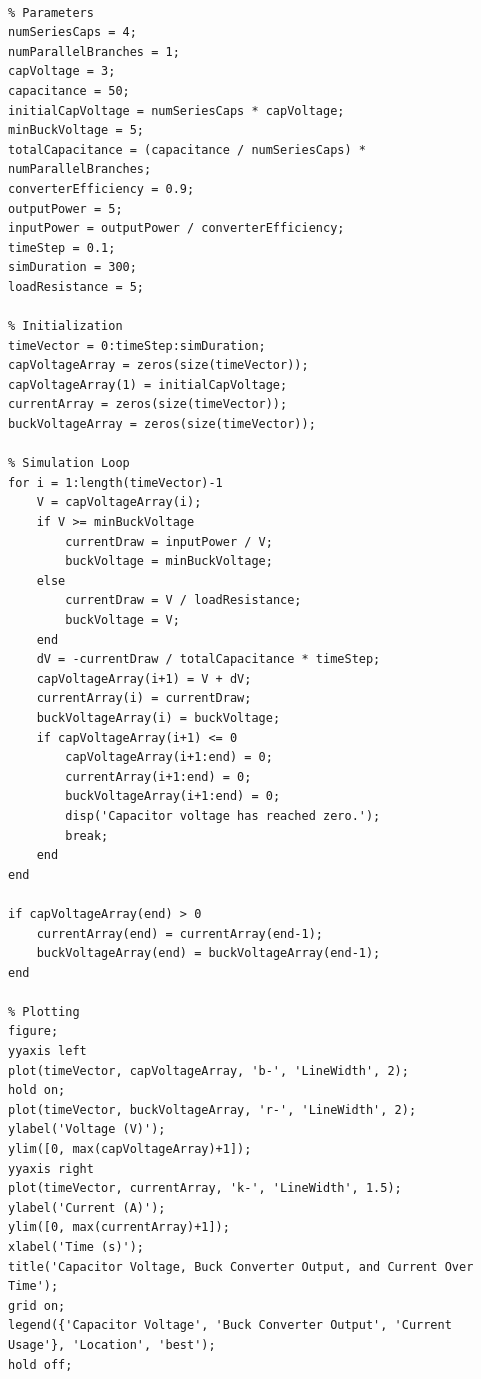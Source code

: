 \documentclass[11pt,a4paper]{article}
\begin{document}

\begin{lstlisting}[caption={Capacitor Discharge Simulation in MATLAB}, label={lst:matlab_code}]
% Capacitor Discharge Simulation Using Euler Method with Switching Model

% Parameters
numSeriesCaps = 4;
numParallelBranches = 1;
capVoltage = 3;
capacitance = 50;
initialCapVoltage = numSeriesCaps * capVoltage;
minBuckVoltage = 5;
totalCapacitance = (capacitance / numSeriesCaps) * numParallelBranches;
converterEfficiency = 0.9;
outputPower = 5;
inputPower = outputPower / converterEfficiency;
timeStep = 0.1;
simDuration = 300;
loadResistance = 5;

% Initialization
timeVector = 0:timeStep:simDuration;
capVoltageArray = zeros(size(timeVector));
capVoltageArray(1) = initialCapVoltage;
currentArray = zeros(size(timeVector));
buckVoltageArray = zeros(size(timeVector));

% Simulation Loop
for i = 1:length(timeVector)-1
    V = capVoltageArray(i);
    if V >= minBuckVoltage
        currentDraw = inputPower / V;
        buckVoltage = minBuckVoltage;
    else
        currentDraw = V / loadResistance;
        buckVoltage = V;
    end
    dV = -currentDraw / totalCapacitance * timeStep;
    capVoltageArray(i+1) = V + dV;
    currentArray(i) = currentDraw;
    buckVoltageArray(i) = buckVoltage;
    if capVoltageArray(i+1) <= 0
        capVoltageArray(i+1:end) = 0;
        currentArray(i+1:end) = 0;
        buckVoltageArray(i+1:end) = 0;
        disp('Capacitor voltage has reached zero.');
        break;
    end
end

if capVoltageArray(end) > 0
    currentArray(end) = currentArray(end-1);
    buckVoltageArray(end) = buckVoltageArray(end-1);
end

% Plotting
figure;
yyaxis left
plot(timeVector, capVoltageArray, 'b-', 'LineWidth', 2);
hold on;
plot(timeVector, buckVoltageArray, 'r-', 'LineWidth', 2);
ylabel('Voltage (V)');
ylim([0, max(capVoltageArray)+1]);
yyaxis right
plot(timeVector, currentArray, 'k-', 'LineWidth', 1.5);
ylabel('Current (A)');
ylim([0, max(currentArray)+1]);
xlabel('Time (s)');
title('Capacitor Voltage, Buck Converter Output, and Current Over Time');
grid on;
legend({'Capacitor Voltage', 'Buck Converter Output', 'Current Usage'}, 'Location', 'best');
hold off;
\end{lstlisting}
\end{document}
